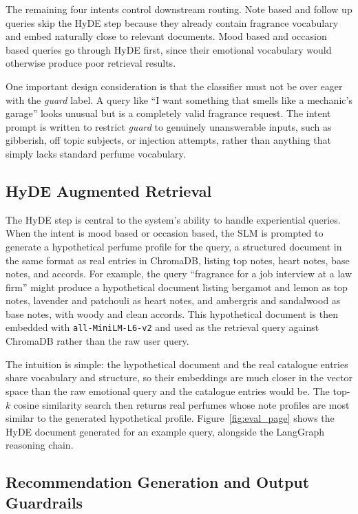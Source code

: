 \documentclass[11pt,a4paper]{article}
\begin{document}
The remaining four intents control downstream routing. Note based and follow up queries skip the HyDE step because they already contain fragrance vocabulary and embed naturally close to relevant documents. Mood based and occasion based queries go through HyDE first, since their emotional vocabulary would otherwise produce poor retrieval results.

One important design consideration is that the classifier must not be over eager with the \textit{guard} label. A query like ``I want something that smells like a mechanic's garage'' looks unusual but is a completely valid fragrance request. The intent prompt is written to restrict \textit{guard} to genuinely unanswerable inputs, such as gibberish, off topic subjects, or injection attempts, rather than anything that simply lacks standard perfume vocabulary.

\subsection{HyDE Augmented Retrieval}

The HyDE step \citep{gao2022hyde} is central to the system's ability to handle experiential queries. When the intent is mood based or occasion based, the SLM is prompted to generate a hypothetical perfume profile for the query, a structured document in the same format as real entries in ChromaDB, listing top notes, heart notes, base notes, and accords. For example, the query ``fragrance for a job interview at a law firm'' might produce a hypothetical document listing bergamot and lemon as top notes, lavender and patchouli as heart notes, and ambergris and sandalwood as base notes, with woody and clean accords. This hypothetical document is then embedded with \texttt{all-MiniLM-L6-v2} \citep{reimers2019sbert} and used as the retrieval query against ChromaDB rather than the raw user query.

The intuition is simple: the hypothetical document and the real catalogue entries share vocabulary and structure, so their embeddings are much closer in the vector space than the raw emotional query and the catalogue entries would be. The top-$k$ cosine similarity search then returns real perfumes whose note profiles are most similar to the generated hypothetical profile. Figure~\ref{fig:eval_page} shows the HyDE document generated for an example query, alongside the LangGraph reasoning chain.

\subsection{Recommendation Generation and Output Guardrails}
\end{document}
